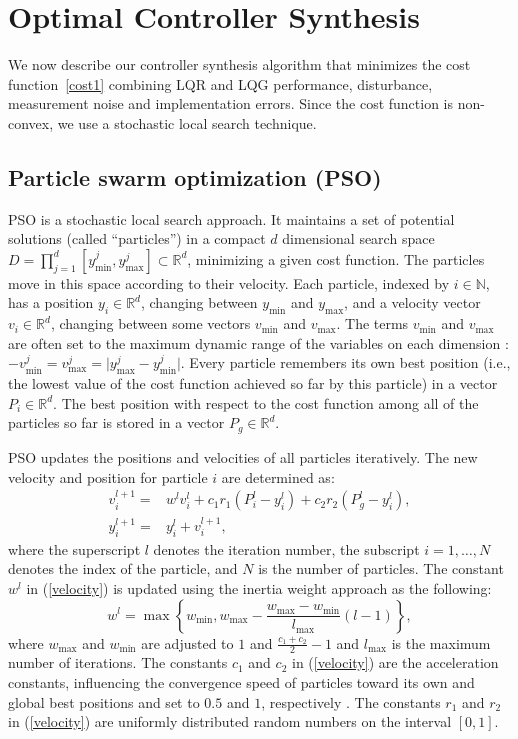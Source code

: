 \documentclass{amsart}
\numberwithin{equation}{section}
\newcommand{\R}{{\mathbb{R}}}
\newcommand{\N}{{\mathbb{N}}}
\begin{document}
\section{Optimal Controller Synthesis}
We now describe our controller synthesis algorithm that minimizes the cost function~\eqref{cost1}
combining LQR and LQG performance, disturbance, measurement noise and implementation errors.
Since the cost function is non-convex, we use a stochastic local search technique.

\subsection{Particle swarm optimization (PSO)}\label{PSO}
PSO is a stochastic local search approach.
It maintains a set of potential solutions (called ``particles'')
in a compact $d$ dimensional search space $D=\prod_{j=1}^d [y_{\min}^j,y_{\max}^j]\subset\R^d$, minimizing a given cost function.
The particles move in this space according to their velocity.
Each particle, indexed by $i\in\N$, has a position $y_i\in\R^d$, changing between $y_{\min}$ and $y_{\max}$, and a velocity vector $v_i\in\R^d$, changing between some vectors $v_{\min}$ and $v_{\max}$. 
The terms $v_{\min}$ and $v_{\max}$ are often set to the maximum dynamic range of the variables on each dimension \cite{majid}: $-v_{\min}^j=v_{\max}^j=\vert y_{\max}^j-y_{\min}^j\vert$. 
Every particle remembers its own best position (i.e., the lowest value of the cost function achieved so far by this particle) in a 
vector $P_i\in\R^d$.
The best position with respect to the cost function among all of the particles 
so far is stored in a vector $P_g\in\R^d$.

PSO updates the positions and velocities of all particles iteratively.
The new velocity and position for particle $i$ are determined as:
\begin{align}
\label{velocity}
v_{i}^{l+1}=&w^lv_{i}^l+c_1r_1\left(P_i^l-y_{i}^l\right)+c_2r_2\left(P_g^l-y_{i}^l\right),\\\label{position}
y_{i}^{l+1}=&y_{i}^l+v_{i}^{l+1},
\end{align}
where the superscript $l$ denotes the iteration number, the subscript
$i=1,\ldots,N$ denotes the index of the particle, and $N$ is the number of particles. 
The constant $w^l$ in (\ref{velocity}) is updated using the inertia weight approach \cite{ebbesen} as the following:
\begin{equation}
w^l=\max\left\{w_{\min},w_{\max}-\frac{w_{\max}-w_{\min}}{l_{\max}}(l-1)\right\},
\end{equation} 
where $w_{\max}$ and $w_{\min}$ are adjusted to $1$ and $\frac{c_1+c_2}{2}-1$ and $l_{\max}$ is the maximum number of iterations. 
The constants $c_1$ and $c_2$ in (\ref{velocity}) are the acceleration constants, influencing the convergence speed of particles toward its own and global best positions
and set to $0.5$ and $1$, respectively \cite{ebbesen}. 
The constants $r_1$ and $r_2$ in (\ref{velocity}) are uniformly distributed random numbers on the interval $[0,1]$.
\end{document}

